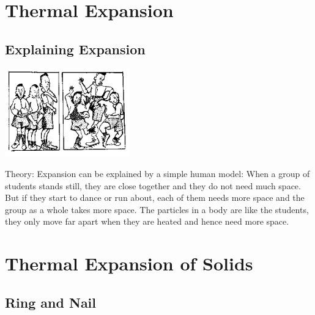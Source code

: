 \section{Thermal Expansion}

\begin{multicols}{2}


\subsection{Explaining Expansion}

\begin{center}
\includegraphics[width=0.4\textwidth]{./img/source/explaining-expansion-2.png}
\end{center}

\begin{description*}
\item[Theory:]{Expansion can be explained by a simple human model: When a group of students stands still, they are close together and they do not need much space. But if they start to dance or run about, each of them needs more space and the group as a whole takes more space. The particles in a body are like the students, they only move far apart when they are heated and hence need more space.}
\end{description*}


\section*{Thermal Expansion of Solids}


\subsection{Ring and Nail}


\end{multicols}
